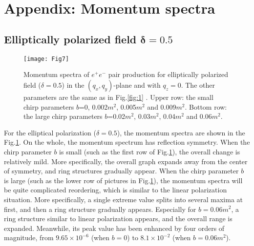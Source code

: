 \documentclass[aps,preprint,superscriptaddress]{revtex4}
\begin{document}
\begin{appendix}
    \appendix
\
\
\

\

\section{Appendix: Momentum spectra}
\subsection{Elliptically polarized field $\mathbf{\delta}$$\mathbf{=}$$\mathbf{0.5}$}
\begin{figure}[ht]%
\begin{center}
\texttt{[image: Fig7]}
\end{center}
\vspace{-10mm}
\caption{Momentum spectra of $e^{+}e^{-}$ pair production for elliptically polarized field ($\delta=0.5$) in the $( q _x,q_y)$-plane and with $q_z=0$. The other parameters are the same as in Fig.\ref{fig:1} .
Upper row: the small chirp parameters $b$=0, 0.002$m^2$, 0.005$m^2$ and 0.009$m^2$. Bottom row: the large chirp parameters $b$=0.02$m^2$, 0.03$m^2$, 0.04$m^2$ and 0.06$m^2$.}
\label{fig:6}
\end{figure}

For the elliptical polarization ($\delta=0.5$), the momentum spectra are shown in the Fig.\ref{fig:6}. On the whole, the momentum spectrum has reflection symmetry. When the chirp parameter $b$ is small (such as the first row of Fig.\ref{fig:6}), the overall change is relatively mild. More specifically, the overall graph expands away from the center of symmetry, and ring structures gradually appear. When the chirp parameter $b$ is large (such as the lower row of pictures in Fig.\ref{fig:6}), the momentum spectra will be quite complicated reordering, which is similar to the linear polarization situation. More specifically, a single extreme value splits into several maxima at first, and then a ring structure gradually appears. Especially for $b=0.06$$m^2$, a ring structure similar to linear polarization appears, and the overall range is expanded. Meanwhile, its peak value has been enhanced by four orders of magnitude, from $9.65\times10^{-6}$ (when $b=0$) to $8.1\times10^{-2}$ (when $b=0.06m^2$).


\end{appendix}
\end{document}
